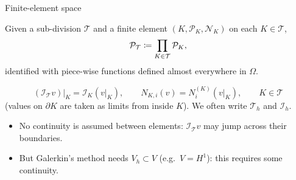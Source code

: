 \begin{frame}{Finite-element space}
    \small
    \begin{definition}
        Given a sub-division $\mathcal T$ and a finite element $(K, \mathcal P_K, \mathcal N_K)$ on each $K \in \mathcal T$,
        \[
            \mathcal P_{\mathcal T} \coloneqq \prod_{K \in \mathcal T} \mathcal P_K ,
        \]
        identified with piece-wise functions defined almost everywhere in $\Omega$.
    \end{definition}
    \begin{definition}
        \[
            (\mathcal I_{\mathcal T} v)\big|_K = \mathcal I_K (v|_K),
            \qquad
            N_{K,i}(v) = N_i^{(K)}(v|_K),
            \qquad K \in \mathcal T
        \]
        (values on $\partial K$ are taken as limits from inside $K$). We often write $\mathcal T_h$ and $\mathcal I_h$.
    \end{definition}
    \begin{itemize}
        \item \alert{No continuity} is assumed between elements: $\mathcal I_{\mathcal T} v$ may jump across their boundaries.
        \item But Galerkin's method needs $V_h \subset V$ (e.g.\ $V = H^1$): this requires some continuity.
    \end{itemize}
\end{frame}

